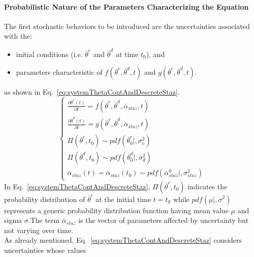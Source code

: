 \paragraph{Probabilistic Nature of the Parameters Characterizing the Equation}
The first stochastic behaviors to be introduced are the uncertainties associated with the:
\begin{itemize}
  \item initial conditions (i.e. $\overline{\theta}^{c}$ and $\overline{\theta}^{d}$ at time $t_{0}$), and
  \item parameters characteristic of  $f\left ( \overline{\theta}^{c},\overline{\theta}^{d},t \right )$ and $g\left ( \overline{\theta}^{c},\overline{\theta}^{d},t \right )$.
\end{itemize}
as shown in Eq.~\ref{eq:systemThetaContAndDescreteStaz}.
\begin{equation}
\label{eq:systemThetaContAndDescreteStaz}
\left\{\begin{matrix}
\frac{\partial  \overline{\theta}^{c}\left ( t \right )}{\partial t}=f\left ( \overline{\theta}^{c},\overline{\theta}^{d}, \overline{\alpha}_{staz} ,      t \right ) \\ 
\frac{\partial  \overline{\theta}^{d}\left ( t \right )}{\partial t}=g\left ( \overline{\theta}^{c},\overline{\theta}^{d},\overline{\alpha}_{staz},t \right )\\
\Pi \left ( \overline{\theta}^{c},t_{0} \right ) \sim pdf\left ( \overline{\theta}^{c}_{0}|,\sigma_{c}^{2} \right )\\ 
\Pi \left ( \overline{\theta}^{d},t_{0} \right ) \sim pdf\left ( \overline{\theta}^{d}_{0}|,\sigma_{d}^{2} \right ) \\
\overline{\alpha}_{staz}\left ( t \right )=\overline{\alpha}_{staz}\left ( t_{0} \right ) \sim pdf\left ( \overline{\alpha}_{staz}^{0}|, \sigma_{staz}^{2} \right )
\end{matrix}\right.
\end{equation}
In Eq.~\ref{eq:systemThetaContAndDescreteStaz}, $\Pi \left ( \overline{\theta}^{c},t_{0} \right )$ indicates the 
probability distribution of $\overline{\theta}^{c}$ at the initial time $t=t_{0}$ while
$pdf\left ( \mu|, \sigma^{2} \right )$ represents a generic probability distribution function having mean value 
$\mu$ and sigma $\sigma$.The term $\overline{\alpha}_{staz}$ is the vector of parameters affected by 
uncertainty but not varying over time.
\\As already mentioned, Eq.~\ref{eq:systemThetaContAndDescreteStaz} considers uncertainties whose values
